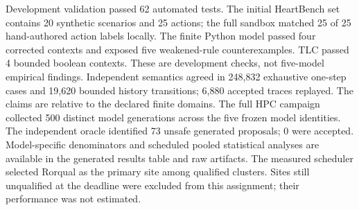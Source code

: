 Development validation passed 62 automated tests. The initial HeartBench set contains 20 synthetic scenarios and 25 actions; the full sandbox matched 25 of 25 hand-authored action labels locally. The finite Python model passed four corrected contexts and exposed five weakened-rule counterexamples. TLC passed 4 bounded boolean contexts. These are development checks, not five-model empirical findings. Independent semantics agreed in 248,832 exhaustive one-step cases and 19,620 bounded history transitions; 6,880 accepted traces replayed. The claims are relative to the declared finite domains. The full HPC campaign collected 500 distinct model generations across the five frozen model identities. The independent oracle identified 73 unsafe generated proposals; 0 were accepted. Model-specific denominators and scheduled pooled statistical analyses are available in the generated results table and raw artifacts. The measured scheduler selected Rorqual as the primary site among qualified clusters. Sites still unqualified at the deadline were excluded from this assignment; their performance was not estimated. 
